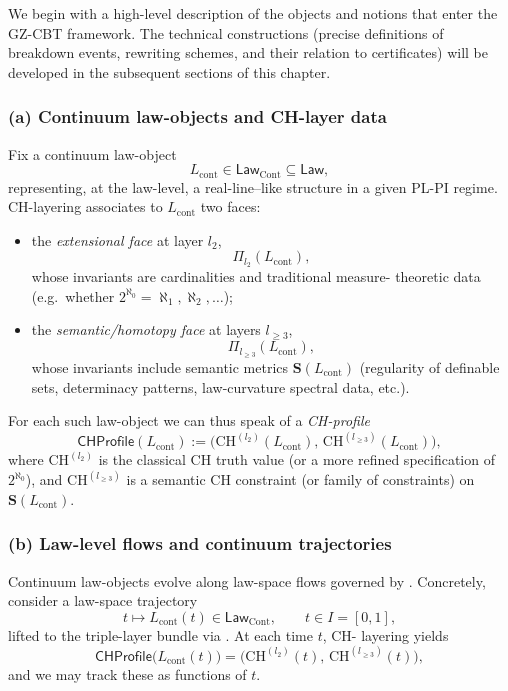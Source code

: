 \documentclass[11pt]{book}
\theoremstyle{plain}
\theoremstyle{definition}
\begin{document}
We begin with a high-level description of the objects and notions that
enter the GZ-CBT framework. The technical constructions (precise
definitions of breakdown events, rewriting schemes, and their relation
to certificates) will be developed in the subsequent sections of this
chapter.

\subsubsection*{(a) Continuum law-objects and CH-layer data}

Fix a continuum law-object
\[
  L_{\mathrm{cont}} \in \mathsf{Law}_{\mathrm{Cont}}\subseteq\mathsf{Law},
\]
representing, at the law-level, a real-line--like structure in a given
PL-PI regime. CH-layering associates to $L_{\mathrm{cont}}$ two faces:

\begin{itemize}
  \item the \emph{extensional face} at layer $l_2$,
        \[
           \Pi_{l_2}(L_{\mathrm{cont}}),
        \]
        whose invariants are cardinalities and traditional measure-
        theoretic data (e.g.\ whether
        $2^{\aleph_0}=\aleph_1,\aleph_2,\dots$);
  \item the \emph{semantic/homotopy face} at layers $l_{\ge3}$,
        \[
           \Pi_{l_{\ge3}}(L_{\mathrm{cont}}),
        \]
        whose invariants include semantic metrics
        $\mathbf{S}(L_{\mathrm{cont}})$ (regularity of definable sets,
        determinacy patterns, law-curvature spectral data, etc.).
\end{itemize}

For each such law-object we can thus speak of a \emph{CH-profile}
\[
   \mathsf{CHProfile}(L_{\mathrm{cont}})
   :=
   \bigl(
     \mathrm{CH}^{(l_2)}(L_{\mathrm{cont}}),\,
     \mathrm{CH}^{(l_{\ge3})}(L_{\mathrm{cont}})
   \bigr),
\]
where $\mathrm{CH}^{(l_2)}$ is the classical CH truth value (or a more
refined specification of $2^{\aleph_0}$), and
$\mathrm{CH}^{(l_{\ge3})}$ is a semantic CH constraint (or family of
constraints) on $\mathbf{S}(L_{\mathrm{cont}})$.



\subsubsection*{(b) Law-level flows and continuum trajectories}

Continuum law-objects evolve along law-space flows governed by
\GZTLC. Concretely, consider a law-space trajectory
\[
   t \longmapsto L_{\mathrm{cont}}(t)
   \in \mathsf{Law}_{\mathrm{Cont}},
   \qquad t\in I=[0,1],
\]
lifted to the triple-layer bundle via \GZTLC. At each time $t$, CH-
layering yields
\[
  \mathsf{CHProfile}\bigl(L_{\mathrm{cont}}(t)\bigr)
  =
  \bigl(
    \mathrm{CH}^{(l_2)}(t),\,
    \mathrm{CH}^{(l_{\ge3})}(t)
  \bigr),
\]
and we may track these as functions of $t$.
\end{document}
